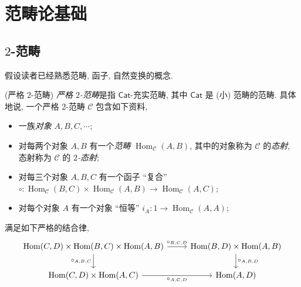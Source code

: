 \chapter{范畴论基础}

\section{$2$-范畴}

假设读者已经熟悉范畴, 函子, 自然变换的概念.

\begin{definition}
	[label={2-categories}]
	{(严格 $2$-范畴)}
	\emph{严格 $2$-范畴}是指 $\mathsf {Cat}$-充实范畴, 其中 $\mathsf {Cat}$ 是 (小) 范畴的范畴. 具体地说, 一个严格 $2$-范畴 $\mathcal C$ 包含如下资料,
	\begin{itemize}
		\item 一族\emph{对象} $A,B,C,\cdots$;
		\item 对每两个对象 $A,B$ 有一个\emph{范畴} $\operatorname{Hom}_{\mathcal C}(A,B)$, 其中的对象称为 $\mathcal C$ 的\emph{态射}, 态射称为 $\mathcal C$ 的 \emph{$2$-态射};
		\item 对每三个对象 $A,B,C$ 有一个函子 ``复合'' $\circ\colon \operatorname{Hom}_{\mathcal C}(B,C)\times \operatorname{Hom}_{\mathcal C}(A,B) \to \operatorname{Hom}_{\mathcal C}(A,C)$;
		\item 对每个对象 $A$ 有一个对象 ``恒等'' $i_A\colon 1\to \operatorname{Hom}_{\mathcal C}(A,A)$;
	\end{itemize}
	满足如下严格的结合律,\footnotemark{}
	\[\begin{tikzcd}[ampersand replacement=\&]
		{\operatorname{Hom}(C,D)\times\operatorname{Hom}(B,C)\times\operatorname{Hom}(A,B)} \& {\operatorname{Hom}(B,D)\times\operatorname{Hom}(A,B)} \\
		{\operatorname{Hom}(C,D)\times\operatorname{Hom}(A,C)} \& {\operatorname{Hom}(A,D)}
		\arrow["{\circ_{A,B,C}}"', from=1-1, to=2-1]
		\arrow["{\circ_{A,C,D}}"', from=2-1, to=2-2]
		\arrow["{\circ_{B,C,D}}", from=1-1, to=1-2]
		\arrow["{\circ_{A,B,D}}", from=1-2, to=2-2]

\end{tikzcd}\]
\end{definition}
